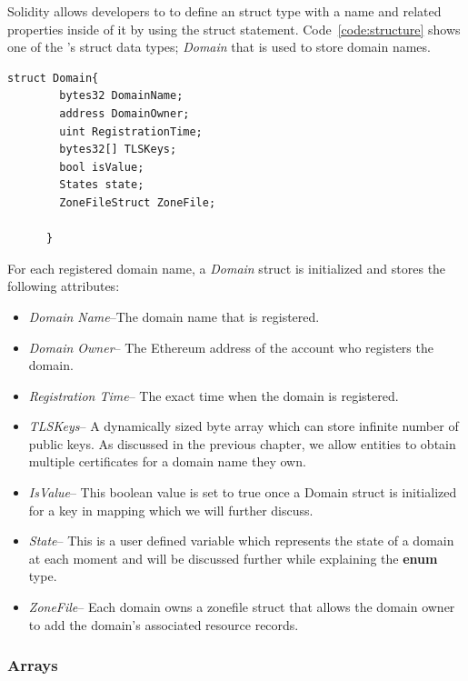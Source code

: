 Solidity allows developers to to define an struct type with a name and related properties inside of it by using the struct statement. Code~\ref{code:structure} shows one of the \Ghazalstar's struct data types; \emph{Domain} that is used to store domain names.

\begin{lstlisting}[basicstyle=\scriptsize\ttfamily,caption={Domain struct that stores domain names and their attributes in \Ghazalstar smart contract.},label={code:structure},float]
struct Domain{ 
        bytes32 DomainName;
        address DomainOwner;
        uint RegistrationTime;
        bytes32[] TLSKeys; 
        bool isValue; 
        States state; 
        ZoneFileStruct ZoneFile; 

      }

\end{lstlisting}
For each registered domain name, a \emph{Domain} struct is initialized and stores the following attributes:

\begin{itemize}
\item \textit{Domain Name}--The domain name that is registered.
\item \textit{Domain Owner}-- The Ethereum address of the account who registers the domain.
\item \textit{Registration Time}-- The exact time when the domain is registered.
\item \textit{TLSKeys}-- A dynamically sized byte array which can store infinite number of public keys. As discussed in the previous chapter, we allow entities to obtain multiple certificates for a domain name they own.
\item \textit{IsValue}-- This boolean value is set to true once a Domain struct is initialized for a key in mapping which we will further discuss.
\item \textit{State}-- This is a user defined variable which represents the state of a domain at each moment and will be discussed further while explaining the \textbf{enum} type. 
\item \textit{ZoneFile}-- Each domain owns a zonefile struct that allows the domain owner to add the domain's associated resource records.
\end{itemize}
\subsubsection*{Arrays}

